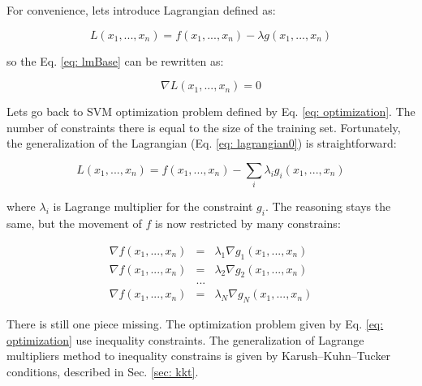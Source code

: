 For convenience, lets introduce Lagrangian defined as:

\begin{equation}
 L (x_1, ..., x_n) = f (x_1, ..., x_n) - \lambda g (x_1, ..., x_n)
 \label{eq: lagrangian0}
\end{equation}

so the Eq. \ref{eq: lmBase} can be rewritten as:

\begin{equation}
 \nabla L (x_1, ..., x_n) = 0
 \label{eq: lagrEq}
\end{equation}

Lets go back to SVM optimization problem defined by Eq. \ref{eq: optimization}. The number of constraints there is equal to the size of the training set. Fortunately, the generalization of the Lagrangian (Eq. \ref{eq: lagrangian0}) is straightforward:

\begin{equation}
 L (x_1, ..., x_n) = f (x_1, ..., x_n) - \sum_i\lambda_i g_i (x_1, ..., x_n)
 \label{eq: lagrangian}
\end{equation}

where $\lambda_i$ is Lagrange multiplier for the constraint $g_i$. The reasoning stays the same, but the movement of $f$ is now restricted by many constrains:

\begin{eqnarray*}
 \nabla f (x_1, ..., x_n) & = &  \lambda_1 \nabla g_1 (x_1, ..., x_n) \\
 \nabla f (x_1, ..., x_n) & = &  \lambda_2 \nabla g_2 (x_1, ..., x_n) \\
			 & ... & \\
 \nabla f (x_1, ..., x_n) & = &  \lambda_N \nabla g_N (x_1, ..., x_n)
\end{eqnarray*}

There is still one piece missing. The optimization problem given by Eq. \ref{eq: optimization} use inequality constraints. The generalization of Lagrange multipliers method to inequality constrains is given by Karush–Kuhn–Tucker conditions, described in Sec. \ref{sec: kkt}.

